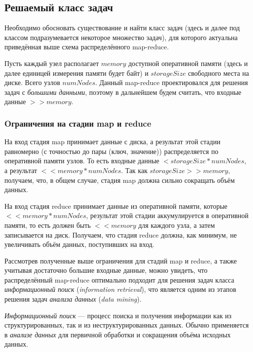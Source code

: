 \documentclass[12pt,a4paper,oneside]{extarticle}
\begin{document}
    \clearpage

    \subsection{Решаемый класс задач}
    \label{sec:tasks}
        Необходимо обосновать существование и найти класс задач (здесь и далее под классом подразумевается некоторое множество задач), для которого актуальна приведённая выше схема распределённого map-reduce.

        Пусть каждый узел располагает $memory$ доступной оперативной памяти (здесь и далее единицей измерения памяти будет байт) и $storageSize$ свободного места на диске. Всего узлов $numNodes$. Данный map-reduce проектировался для решения задач с {\it большими данными}, поэтому в дальнейшем будем считать, что входные данные $>>memory$. 

        \subsubsection{Oграничения на стадии map и reduce}
            На вход стадия map принимает данные с диска, а результат этой стадии равномерно (с точностью до пары (ключ, значение)) распределяется по оперативной памяти узлов. То есть входные данные $<storageSize*numNodes$, а результат $<< memory*numNodes$. Так как $storageSize >> memory$, получаем, что, в общем случае, стадия map должна сильно сокращать объём данных.

            На вход стадия reduce принимает данные из оперативной памяти, которые $<< memory*numNodes$, результат этой стадии аккумулируется в оперативной памяти, то есть должен быть $<<memory$ для каждого узла, а затем записывается на диск. Получаем, что стадия reduce должна, как минимум, не увеличивать объём данных, поступивших на вход.

            Рассмотрев полученные выше ограничения для стадий map и reduce, а также учитывая достаточно большие входные данные, можно увидеть, что распределённый map-reduce оптимально подходит для решения задач класса {\it информационный поиск} ({\it information retrieval}), что является одним из этапов решения задач {\it анализа данных} ({\it data mining}).

            {\it Информационный поиск} --- процесс поиска и получения информации как из структурированных, так и из неструктурированных данных. Обычно применяется в {\it анализе данных} для первичной обработки и сокращения объёма исходных данных. 
\end{document}
